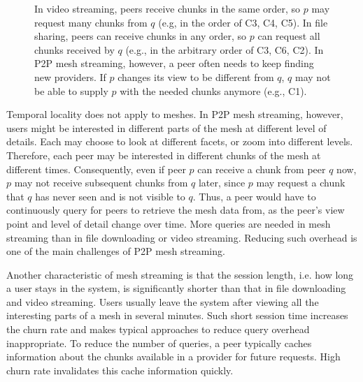     \begin{figure}
    \centering
    \caption[Difference between P2P video streaming, P2P file sharing, and P2P view-dependent mesh streaming.]
    {In video streaming, peers receive chunks in the same order, so $p$
    may request many chunks from $q$ (e.g, in the order of C3, C4, C5).
	 In file sharing, peers can receive
    chunks in any order, so $p$ can request all chunks received by $q$
	(e.g., in the arbitrary order of C3, C6, C2). In
    P2P mesh streaming, however, a peer often needs to keep finding
    new providers.  If $p$ changes its view to be different from $q$,
	$q$ may not be able to supply $p$ with the needed chunks anymore 
	(e.g., C1). \label{f:diff}}
    \end{figure}

    Temporal locality does not apply to meshes.  In P2P mesh
    streaming, however, users might be interested in
    different parts of the mesh at different level of
    details.  Each may choose to look at different facets,
    or zoom into different levels.  Therefore, each peer may
    be interested in different chunks of the mesh at
    different times.  Consequently, even if peer $p$ can
    receive a chunk from peer $q$ now, $p$ may not receive
    subsequent chunks from $q$ later, since $p$ may request
    a chunk that $q$ has never seen and is not visible to
    $q$. %
    Thus, a peer would have
    to continuously query for peers to retrieve the mesh
    data from, as the peer's view point and level of detail
    change over time.  More queries are needed in mesh
    streaming than in file downloading or video streaming.
    Reducing such overhead is one of the main challenges of
    P2P mesh streaming.

    Another characteristic of mesh streaming is that the
    session length, i.e. how long a user stays in the
    system, is significantly shorter than that in file
    downloading and video streaming.  Users usually leave
    the system after viewing all the interesting parts of a
    mesh in several minutes.  Such short session time
    increases the churn rate and makes typical approaches to
    reduce query overhead inappropriate. To reduce the
    number of queries, a peer typically caches information
    about the chunks available in a provider for future
    requests.  High churn rate invalidates this cache
    information quickly.

